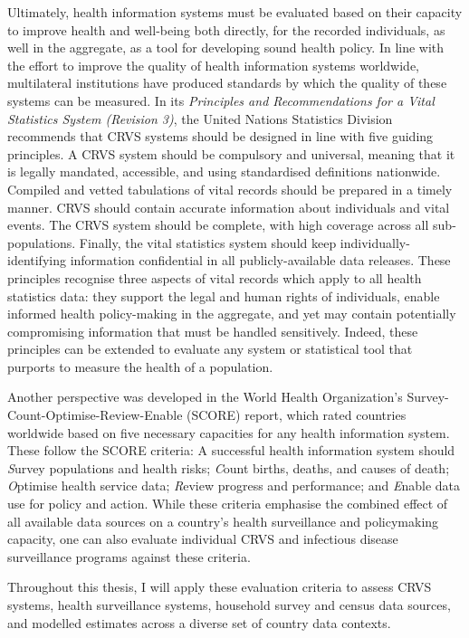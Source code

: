 \documentclass[
]{report}
\begin{document}
Ultimately, health information systems must be evaluated based on their capacity to improve health and well-being both directly, for the recorded individuals, as well in the aggregate, as a tool for developing sound health policy. In line with the effort to improve the quality of health information systems worldwide, multilateral institutions have produced standards by which the quality of these systems can be measured. In its \emph{Principles and Recommendations for a Vital Statistics System (Revision 3)}, the United Nations Statistics Division recommends that CRVS systems should be designed in line with five guiding principles. A CRVS system should be compulsory and universal, meaning that it is legally mandated, accessible, and using standardised definitions nationwide. Compiled and vetted tabulations of vital records should be prepared in a timely manner. CRVS should contain accurate information about individuals and vital events. The CRVS system should be complete, with high coverage across all sub-populations. Finally, the vital statistics system should keep individually-identifying information confidential in all publicly-available data releases.\autocite{UnitedNationsStatisticsDivision2014} These principles recognise three aspects of vital records which apply to all health statistics data: they support the legal and human rights of individuals, enable informed health policy-making in the aggregate, and yet may contain potentially compromising information that must be handled sensitively. Indeed, these principles can be extended to evaluate any system or statistical tool that purports to measure the health of a population.

Another perspective was developed in the World Health Organization's Survey-Count-Optimise-Review-Enable (SCORE) report, which rated countries worldwide based on five necessary capacities for any health information system. These follow the SCORE criteria: A successful health information system should \emph{S}urvey populations and health risks; \emph{C}ount births, deaths, and causes of death; \emph{O}ptimise health service data; \emph{R}eview progress and performance; and \emph{E}nable data use for policy and action.\autocite{WorldHealthOrganization2021} While these criteria emphasise the combined effect of all available data sources on a country's health surveillance and policymaking capacity, one can also evaluate individual CRVS and infectious disease surveillance programs against these criteria.

Throughout this thesis, I will apply these evaluation criteria to assess CRVS systems, health surveillance systems, household survey and census data sources, and modelled estimates across a diverse set of country data contexts.
\end{document}
